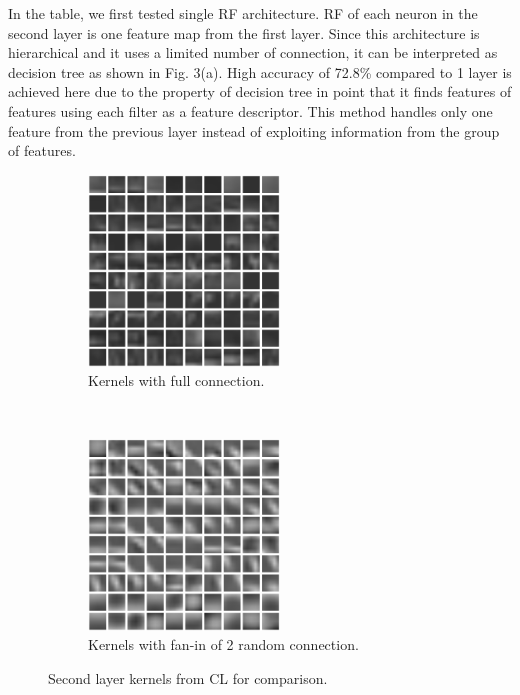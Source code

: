 \documentclass{article} %
\begin{document}
In the table, we first tested single RF architecture.
RF of each neuron in the second layer is one feature map from the first layer.
Since this architecture is hierarchical and it uses a limited number of connection, it can be interpreted as decision tree as shown in Fig. 3(a).
High accuracy of 72.8\% compared to 1 layer is achieved here due to the property of decision tree in point that it finds
features of features using each filter as a feature descriptor.
This method handles only one feature from the previous layer instead of exploiting information from the group of features.

\begin{figure}
        \centering
        \label{fig-secondkernels}
        \begin{subfigure}[b]{0.5\textwidth}
                \centering
                \includegraphics[width=2.0in]{fig-kernels2-full.eps}
                \caption{Kernels with full connection.}
        \end{subfigure}%
        ~%
        \begin{subfigure}[b]{0.5\textwidth}
                \centering
                \includegraphics[width=2.0in]{fig-kernels2-random.eps}
                \caption{Kernels with fan-in of 2 random connection.}
        \end{subfigure}
        \caption{Second layer kernels from CL for comparison.}
\end{figure}
\end{document}
